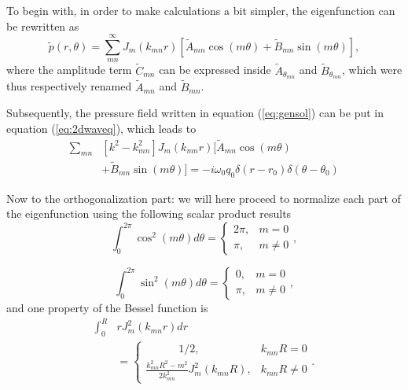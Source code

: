 \documentclass[%
 reprint,
 amsmath,amssymb,
 aps,
]{revtex4-2}
\begin{document}
To begin with, in order to make calculations a bit simpler, the eigenfunction can be rewritten as
\begin{equation}
        \tilde{p}(r, \theta) = \sum_{mn}^{\infty} J_m(k_{mn}r) \left[ \tilde{A}_{mn} \cos(m \theta) + \tilde{B}_{mn} \sin(m \theta) \right], \label{eq:gensol}
\end{equation}
where the amplitude term $\tilde{C}_{mn}$ can be expressed inside $\tilde{A}_{\theta_{mn}}$ and $\tilde{B}_{\theta_{mn}}$, which were thus respectively renamed $\tilde{A}_{mn}$ and $\tilde{B}_{mn}$.

Subsequently, the pressure field written in equation (\ref{eq:gensol}) can be put in equation (\ref{eq:2dwaveq}), which leads to
\begin{equation}
    \begin{split}
        \sum_{mn} &\left[ k^2 - k_{mn}^2 \right] J_m(k_{mn}r) \Big[ \tilde{A}_{mn} \cos(m\theta) \\&+ \tilde{B}_{mn} \sin(m\theta) \Big]= - i \omega_0 q_0 \delta(r - r_0) \delta(\theta - \theta_0)
    \end{split} \label{eq:rawsol}
\end{equation}

Now to the orthogonalization part: we will here proceed to normalize each part of the eigenfunction using the following scalar product results 
\begin{equation}
   \int_0^{2 \pi} \cos^2\left( m \theta \right) d\theta = 
    \begin{cases}    
        2 \pi, & m = 0\\
        \pi, & m \ne 0
    \end{cases}, \label{eq:dp_2}
\end{equation}

\begin{equation}
    \int_0^{2 \pi} \sin^2\left( m \theta \right) d\theta = 
    \begin{cases}    
        0, & m = 0\\
        \pi, & m \ne 0
    \end{cases}, \label{eq:dp_3}
\end{equation}
and one property of the Bessel function is\cite{abramsteg}
\begin{equation}
    \begin{split}
        \int_0^{R} &r J^2_m (k_{mn} r)dr \\ &=
    \begin{cases}    
        \quad  \quad \quad 1/2, & k_{mn}R = 0\\
        \frac{k^2_{mn} R^2 - m^2}{2 k^2_{mn}} J^2_m (k_{mn} R), & k_{mn}R \ne 0
    \end{cases}.
    \end{split} \label{eq:dp_4}
\end{equation}
\end{document}
